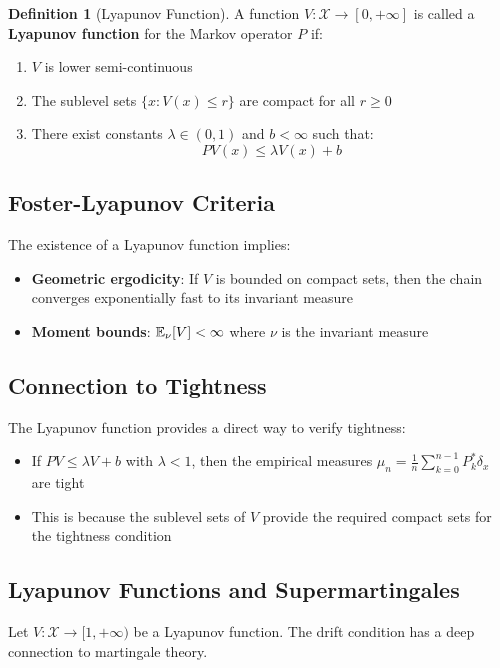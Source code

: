 \documentclass{amsart}
\let\originalmathbb\mathbb
\renewcommand{\mathbb}[1]{%
    \ifstrequal{#1}{1}{\mathbbm{#1}}{\originalmathbb{#1}}%
}
\theoremstyle{plain}
\theoremstyle{definition}
\newtheorem{definition}[theorem]{Definition}
\theoremstyle{remark}
\begin{document}
\begin{definition}[Lyapunov Function]
A function $V: \mathcal{X} \to [0,+\infty]$ is called a \textbf{Lyapunov function} for the Markov operator $P$ if:
	\begin{enumerate}
		\item $V$ is lower semi-continuous
		\item The sublevel sets $\{x: V(x) \leq r\}$ are compact for all $r \geq 0$
		\item There exist constants $\lambda \in (0,1)$ and $b < \infty$ such that:
\[
PV(x) \leq \lambda V(x) + b
\]
	\end{enumerate}
\end{definition}
\subsection{Foster-Lyapunov Criteria}

The existence of a Lyapunov function implies:

\begin{itemize}
	\item \textbf{Geometric ergodicity}: If $V$ is bounded on compact sets, then the chain converges exponentially fast to its invariant measure
	\item \textbf{Moment bounds}: $\mathbb{E}_\nu[V] < \infty$ where $\nu$ is the invariant measure
\end{itemize}

\subsection{Connection to Tightness}

The Lyapunov function provides a direct way to verify tightness:

\begin{itemize}
	\item If $PV \leq \lambda V + b$ with $\lambda < 1$, then the empirical measures $\mu_n = \frac{1}{n}\sum_{k=0}^{n-1}P^*_k\delta_x$ are tight
	\item This is because the sublevel sets of $V$ provide the required compact sets for the tightness condition
\end{itemize}

\subsection{Lyapunov Functions and Supermartingales}

Let $V: \mathcal{X} \to [1,+\infty)$ be a Lyapunov function. The drift condition has a deep connection to martingale theory.
\end{document}
